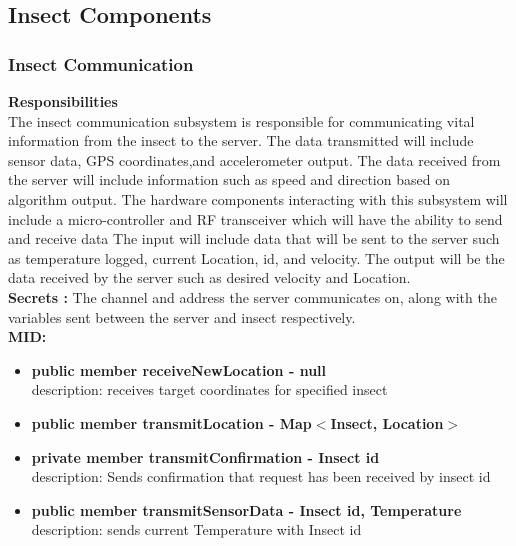 \documentclass[11pt]{article}
\begin{document}
\subsection{Insect Components}
\subsubsection{Insect Communication}
\textbf{Responsibilities}\\
The insect communication subsystem is responsible for communicating vital information from the insect to the server. The data  transmitted will include sensor data, GPS coordinates,and accelerometer output. The data received from the server will include information such as speed and direction based on algorithm output. The hardware components interacting with this subsystem will include a micro-controller and RF transceiver which will have the ability to send and receive data The input will include data that will be sent to the server such as temperature logged, current Location, id, and velocity. The output will be the data received by the server such as desired velocity and Location. \\
\newline
\textbf{Secrets : } The channel and address the server communicates on, along with the variables sent between the server and insect respectively. \\
\newline
\textbf{MID:}
\begin{itemize}
    \item \textbf{public member receiveNewLocation - null} \\ description: receives target coordinates for specified insect
    \item \textbf{public member transmitLocation - Map$<$Insect, Location$>$}
    \item \textbf{private member transmitConfirmation - Insect id}
    \\ description: Sends confirmation that request has been received by insect id
    \item \textbf{public member transmitSensorData - Insect id, Temperature} \\
    description: sends current Temperature with Insect id 
    
\end{itemize}
\end{document}
